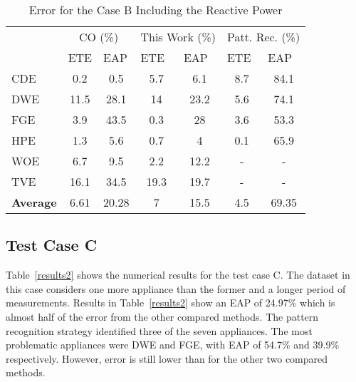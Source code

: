 \begin{table}[tb]
\centering
\caption{Error for the Case B Including the Reactive Power}
\label{results_Q}
\begin{tabular}{lcccccc}
\hline
    & \multicolumn{2}{c}{CO (\%)}                            & \multicolumn{2}{c}{This Work (\%)}                    & \multicolumn{2}{c}{Patt. Rec. (\%)}                     \\
    & \multicolumn{1}{l}{ETE} & \multicolumn{1}{l}{EAP} & \multicolumn{1}{l}{ETE} & \multicolumn{1}{l}{EAP} & \multicolumn{1}{l}{ETE} & \multicolumn{1}{l}{EAP} \\ \hline
CDE & 0.2                     & 0.5                     & 5.7                     & 6.1                     & 8.7                     & 84.1                    \\
DWE & 11.5                     & 28.1                    & 14                    & 23.2                    & 5.6                     & 74.1                    \\
FGE & 3.9                     & 43.5                    & 0.3                    & 28                    & 3.6                     & 53.3                    \\
HPE & 1.3                    & 5.6                    & 0.7                     & 4                     & 0.1                     & 65.9                    \\
WOE & 6.7                     & 9.5                     & 2.2                     & 12.2                    & -                       & -                       \\
TVE  & 16.1                   & 34.5                      & 19.3                    & 19.7                    & -                       & -                       \\ \hline
\textbf{Average} & 6.61       & 20.28                   & 7                     & 15.5                      & 4.5                     & 69.35                   \\ \hline
\end{tabular}
\end{table}

\subsection{Test Case C}
Table~\ref{results2} shows the numerical results for the test case C. The dataset in this case considers one more appliance than the former and a longer period of measurements. Results in Table~\ref{results2} show an EAP of 24.97\% which is almost half of the error from the other compared methods. The pattern recognition strategy identified three of the seven appliances. The most problematic appliances were DWE and FGE, with EAP of 54.7\% and 39.9\% respectively. However, error is still lower than for the other two compared methods. 

